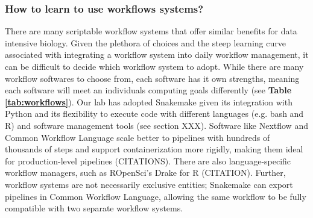 \documentclass[10pt,letterpaper]{article}
\begin{document}
\subsubsection*{How to learn to use workflows systems?}

There are many scriptable workflow systems that offer similar benefits for data intensive biology. 
Given the plethora of choices and the steep learning curve associated with integrating a workflow system into daily workflow management, it can be difficult to decide which workflow system to adopt. 
While there are many workflow softwares to choose from, each software has it own strengths, meaning each software will meet an individuals computing goals differently (see \textbf{Table \ref{tab:workflows}}).
Our lab has adopted Snakemake given its integration with Python and its flexibility to execute code with different languages (e.g. bash and R) and software management tools (see section XXX).
Software like Nextflow and Common Workflow Language scale better to pipelines with hundreds of thousands of steps and support containerization more rigidly, making them ideal for production-level pipelines (CITATIONS). 
There are also language-specific workflow managers, such as ROpenSci's Drake for R (CITATION). 
Further, workflow systems are not necessarily exclusive entities; Snakemake can export pipelines in Common Workflow Language, allowing the same workflow to be fully compatible with two separate workflow systems. 

\begin{table}
\caption{\label{tab:workflows} Popular bioinformatics workflow systems, documentation, and example workflows.}
\end{table}
\end{document}
